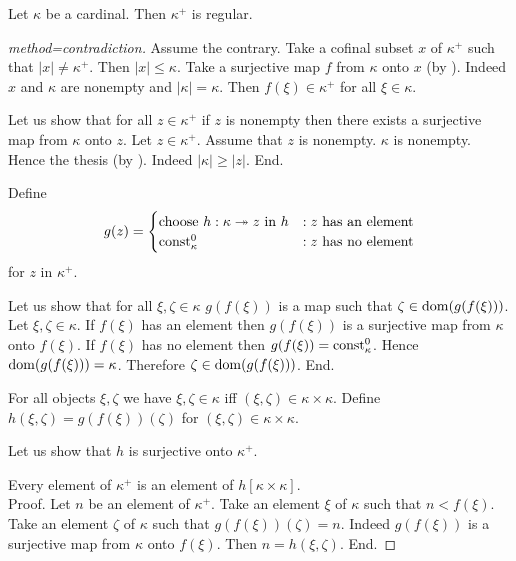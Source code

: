 \documentclass{article}
\begin{document}
  \begin{forthel}
    \begin{theorem*}[title=Hausdorff]
      Let $\kappa$ be a cardinal.
      Then $\kappa^+$ is regular.
    \end{theorem*}
    \begin{proof}[method=contradiction]
      Assume the contrary.
      Take a cofinal subset $x$ of $\kappa^+$ such that $|x| \neq \kappa^+$.
      Then $|x| \leq \kappa$.
      Take a surjective map $f$ from $\kappa$ onto $x$ (by ).
      Indeed $x$ and $\kappa$ are nonempty and $|\kappa| = \kappa$.
      Then $f(\xi) \in \kappa^+$ for all $\xi \in \kappa$.

      Let us show that for all $z \in \kappa^+$ if $z$ is nonempty then there exists a surjective map from $\kappa$ onto $z$.
        Let $z \in \kappa^+$.
        Assume that $z$ is nonempty.
        $\kappa$ is nonempty.
        Hence the thesis (by ).
        Indeed $|\kappa| \geq |z|$.
      End.

      Define \[ g(z) =
        \begin{cases}
          \text{choose $h : \kappa \twoheadrightarrow z$ in $h$}
          & : \text{$z$ has an element}
          \\
          \text{$\textrm{const}_{\kappa}^{0}$}
          & : \text{$z$ has no element}
        \end{cases}
      \] for $z$ in $\kappa^+$.

      Let us show that for all $\xi, \zeta \in \kappa$ $g(f(\xi))$ is a map such that $\zeta \in \operatorname{dom}(g(f(\xi)))$.
        Let $\xi, \zeta \in \kappa$.
        If $f(\xi)$ has an element then $g(f(\xi))$ is a surjective map from $\kappa$ onto $f(\xi)$.
        If $f(\xi)$ has no element then $g(f(\xi)) = \textrm{const}_{\kappa}^{0}$.
        Hence $\operatorname{dom}(g(f(\xi))) = \kappa$.
        Therefore $\zeta \in \operatorname{dom}(g(f(\xi)))$.
      End.

      For all objects $\xi, \zeta$ we have $\xi, \zeta \in \kappa$ iff $(\xi, \zeta) \in \kappa \times \kappa$.
      Define $h(\xi,\zeta) = g(f(\xi))(\zeta)$ for $(\xi,\zeta) \in \kappa \times \kappa$.

      Let us show that $h$ is surjective onto $\kappa^+$.

        Every element of $\kappa^+$ is an element of $h[\kappa \times \kappa]$. \\
        Proof.
          Let $n$ be an element of $\kappa^+$.
          Take an element $\xi$ of $\kappa$ such that $n < f(\xi)$.
          Take an element $\zeta$ of $\kappa$ such that $g(f(\xi))(\zeta) = n$.
          Indeed $g(f(\xi))$ is a surjective map from $\kappa$ onto $f(\xi)$.
          Then $n = h(\xi,\zeta)$.
        End.


\end{proof}
\end{forthel}
\end{document}
